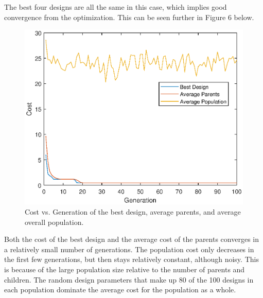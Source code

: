 \documentclass[a4paper,12pt]{report}
\begin{document}
\begin{table}[H]
\centering
\caption{Design Parameters and Cost of Best Designs}
\end{table}

The best four designs are all the same in this case, which implies good convergence from the optimization. This can be seen further in Figure 6 below.

\begin{figure}[H]
\begin{nscenter}
  \includegraphics[width=0.75\linewidth]{part2_4.eps}
  \caption{Cost vs. Generation of the best design, average parents, and average overall population.}
  \end{nscenter}
\end{figure}

Both the cost of the best design and the average cost of the parents converges in a relatively small number of generations. The population cost only decreases in the first few generations, but then stays relatively constant, although noisy. This is because of the large population size relative to the number of parents and children. The random design parameters that make up 80 of the 100 designs in each population dominate the average cost for the population as a whole.
\end{document}
